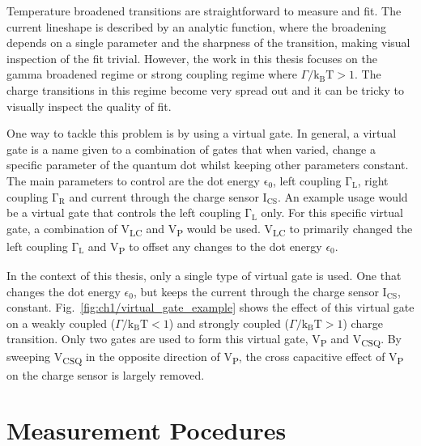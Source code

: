 Temperature broadened transitions are straightforward to measure and fit. The current lineshape is described by an analytic function, where the broadening depends on a single parameter and the sharpness of the transition, making visual inspection of the fit trivial. However, the work in this thesis focuses on the gamma broadened regime or strong coupling regime where $\Gamma/\mathrm{k_BT}>1$. The charge transitions in this regime become very spread out and it can be tricky to visually inspect the quality of fit. 

One way to tackle this problem is by using a virtual gate. In general, a virtual gate is a name given to a combination of gates that when varied, change a specific parameter of the quantum dot whilst keeping other parameters constant. The main parameters to control are the dot energy $\mathrm{\epsilon_0}$, left coupling $\mathrm{\Gamma_L}$, right coupling $\mathrm{\Gamma_R}$ and current through the charge sensor $\mathrm{I_{CS}}$. An example usage would be a virtual gate that controls the left coupling $\mathrm{\Gamma_L}$ only. For this specific virtual gate, a combination of V\textsubscript{LC} and V\textsubscript{P} would be used. V\textsubscript{LC} to primarily changed the left coupling $\mathrm{\Gamma_L}$ and V\textsubscript{P} to offset any changes to the dot energy $\epsilon_0$. 


In the context of this thesis, only a single type of virtual gate is used. One that changes the dot energy $\epsilon_0$, but keeps the current through the charge sensor $\mathrm{I_{CS}}$, constant. Fig.~\ref{fig:ch1/virtual_gate_example} shows the effect of this virtual gate on a weakly coupled ($\Gamma/\mathrm{k_BT}<1$) and strongly coupled ($\Gamma/\mathrm{k_BT}>1$) charge transition. Only two gates are used to form this virtual gate, V\textsubscript{P} and V\textsubscript{CSQ}. By sweeping V\textsubscript{CSQ} in the opposite direction of V\textsubscript{P}, the cross capacitive effect of V\textsubscript{P} on the charge sensor is largely removed. 


\afterpage{\clearpage}
\section{Measurement Pocedures}


